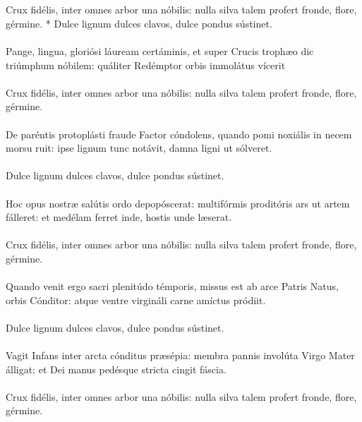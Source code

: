\documentclass[12pt, a4paper]{article}
\begin{document}
	\\
	\\
	 Crux fidélis, inter omnes arbor una nóbilis: nulla silva talem profert fronde, flore, gérmine. * Dulce lignum dulces clavos, dulce pondus sústinet.
	\\\\
	Pange, lingua, gloriósi
	láuream certáminis,
	et super Crucis trophæo
	dic triúmphum nóbilem:
	quáliter Redémptor orbis
	immolátus vícerit
	\\\\
	 Crux fidélis, inter omnes arbor una nóbilis: nulla silva talem profert fronde, flore, gérmine.
	\\\\
	De paréntis protoplásti
	fraude Factor cóndolens,
	quando pomi noxiális
	in necem morsu ruit:
	ipse lignum tunc notávit,
	damna ligni ut sólveret.
	\\\\
	 Dulce lignum dulces clavos, dulce pondus sústinet.
	\\\\
	Hoc opus nostræ salútis
	ordo depopóscerat:
	multifórmis proditóris
	ars ut artem fálleret:
	et medélam ferret inde,
	hostis unde læserat.
	\\\\
	 Crux fidélis, inter omnes arbor una nóbilis: nulla silva talem profert fronde, flore, gérmine.
	\\\\
	Quando venit ergo sacri
	plenitúdo témporis,
	missus est ab arce Patris
	Natus, orbis Cónditor:
	atque ventre virgináli
	carne amíctus pródiit.
	\\\\
	 Dulce lignum dulces clavos, dulce pondus sústinet.
	\\\\
	Vagit Infans inter arcta
	cónditus præsépia:
	membra pannis involúta
	Virgo Mater álligat:
	et Dei manus pedésque
	stricta cingit fáscia.
	\\\\
	 Crux fidélis, inter omnes arbor una nóbilis: nulla silva talem profert fronde, flore, gérmine.
\end{document}
